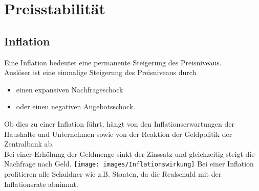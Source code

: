 \section{Preisstabilität}
\begin{multicols}{2}
   \subsection{Inflation}
Eine Inflation bedeutet eine permanente Steigerung des Preisniveaus.\\
Auslöser ist eine einmalige Steigerung des Preisniveaus durch
\begin{itemize}
	\item einen expansiven Nachfrageschock
	\item oder einen negativen Angebotsschock.
\end{itemize}
Ob dies zu einer Inflation führt, hängt von den Inflationserwartungen der Haushalte und Unternehmen sowie von der Reaktion der Geldpolitik der Zentralbank ab.\\
Bei einer Erhöhung der Geldmenge sinkt der Zinssatz und gleichzeitig steigt die Nachfrage nach Geld.
\vfill\null 
\columnbreak
\texttt{[image: images/Inflationswirkung]}
Bei einer Inflation profitieren alle Schuldner wie z.B. Staaten, da die Realschuld mit der Inflationsrate abnimmt.
\end{multicols}

